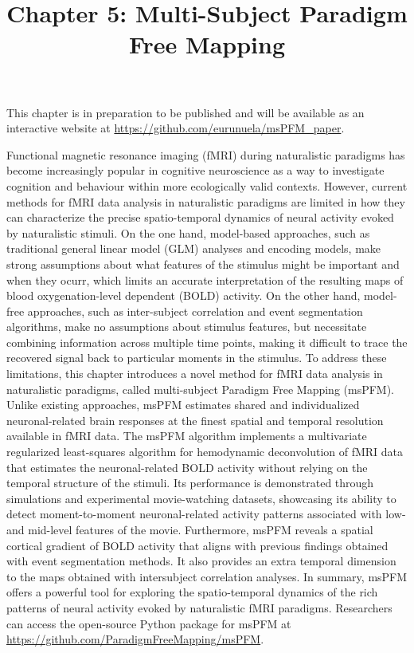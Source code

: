 \title{Chapter 5: Multi-Subject Paradigm Free Mapping}
\label{cha:multi-subject}

This chapter is in preparation to be published and will be available as an
interactive website at \url{https://github.com/eurunuela/msPFM\_paper}.

Functional magnetic resonance imaging (fMRI) during naturalistic paradigms has
become increasingly popular in cognitive neuroscience as a way to investigate
cognition and behaviour within more ecologically valid contexts. However,
current methods for fMRI data analysis in naturalistic paradigms are limited in
how they can characterize the precise spatio-temporal dynamics of neural
activity evoked by naturalistic stimuli. On the one hand, model-based
approaches, such as traditional general linear model (GLM) analyses and encoding
models, make strong assumptions about what features of the stimulus might be
important and when they ocurr, which limits an accurate interpretation of the
resulting maps of blood oxygenation-level dependent (BOLD) activity. On the
other hand, model-free approaches, such as inter-subject correlation and event
segmentation algorithms, make no assumptions about stimulus features, but
necessitate combining information across multiple time points, making it
difficult to trace the recovered signal back to particular moments in the
stimulus. To address these limitations, this chapter introduces a novel method
for fMRI data analysis in naturalistic paradigms, called multi-subject
Paradigm Free Mapping (msPFM). Unlike existing approaches, msPFM estimates shared and
individualized neuronal-related brain responses at the finest spatial and
temporal resolution available in fMRI data. The msPFM algorithm implements a
multivariate regularized least-squares algorithm for hemodynamic deconvolution
of fMRI data that estimates the neuronal-related BOLD activity without relying
on the temporal structure of the stimuli. Its performance is demonstrated
through simulations and experimental movie-watching datasets, showcasing its
ability to detect moment-to-moment neuronal-related activity patterns associated
with low- and mid-level features of the movie. Furthermore, msPFM reveals a
spatial cortical gradient of BOLD activity that aligns with previous findings
obtained with event segmentation methods. It also provides an extra temporal
dimension to the maps obtained with intersubject correlation analyses.  
In summary, msPFM offers a powerful tool for exploring the spatio-temporal 
dynamics of the rich patterns of neural activity evoked by naturalistic fMRI paradigms. 
Researchers can access the open-source Python package for msPFM at
\url{https://github.com/ParadigmFreeMapping/msPFM}.

